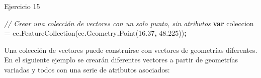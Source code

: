 \documentclass[
  12pt,
  letterpaper,
  twoside]{book}
\newenvironment{Shaded}{\begin{snugshade}}{\end{snugshade}}
\newcommand{\AttributeTok}[1]{\textcolor[rgb]{0.77,0.63,0.00}{#1}}
\newcommand{\CommentTok}[1]{\textcolor[rgb]{0.56,0.35,0.01}{\textit{#1}}}
\newcommand{\FloatTok}[1]{\textcolor[rgb]{0.00,0.00,0.81}{#1}}
\newcommand{\FunctionTok}[1]{\textcolor[rgb]{0.00,0.00,0.00}{#1}}
\newcommand{\KeywordTok}[1]{\textcolor[rgb]{0.13,0.29,0.53}{\textbf{#1}}}
\newcommand{\NormalTok}[1]{#1}
\newcommand{\OperatorTok}[1]{\textcolor[rgb]{0.81,0.36,0.00}{\textbf{#1}}}
\begin{document}
Ejercicio 15

\begin{Shaded}
\begin{Highlighting}[]
\CommentTok{// Crear una colección de vectores con un solo punto, sin atributos }
\KeywordTok{var}\NormalTok{ coleccion }\OperatorTok{=}\NormalTok{ ee}\OperatorTok{.}\FunctionTok{FeatureCollection}\NormalTok{(ee}\OperatorTok{.}\AttributeTok{Geometry}\OperatorTok{.}\FunctionTok{Point}\NormalTok{(}\FloatTok{16.37}\OperatorTok{,} \FloatTok{48.225}\NormalTok{))}\OperatorTok{;}
\end{Highlighting}
\end{Shaded}

Una colección de vectores puede construirse con vectores de geometrías diferentes. En el siguiente ejemplo se crearán diferentes vectores a partir de geometrías variadas y todos con una serie de atributos asociados:
\end{document}
